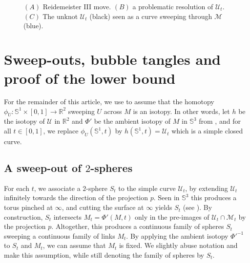 \documentclass[10pt,a4paper]{amsart}
\newcommand{\R}{\mathbb{R}}
\newcommand{\Sp}{\mathbb{S}}
\begin{document}
\begin{figure}
\begin{center}
\caption{$(A)$ Reidemeister III move. $(B)$ a problematic resolution of $\mathcal{U}_t$. $(C)$ The unknot $\mathcal{U}_t$ (black) seen as a curve sweeping through $\mathcal{M}$ (blue).}
\label{pic_reidemeister_issues}
\end{center}
\end{figure}

\section{Sweep-outs, bubble tangles and proof of the lower bound}\label{sec_tangle}

For the remainder of this article, we use  to assume that the homotopy $\phi_U : \Sp^1 \times [0,1] \to \R^2$ sweeping $U$ across $M$ is an isotopy.
In other words, let $h$ be the isotopy of $\mathcal{U}$ in $\R^2$ and $\Phi'$ be the ambient isotopy of $M$ in $\Sp^3$ from , and for all $t \in [0,1]$, we replace $\phi_U (\Sp^1, t)$ by $h (\Sp^1, t) = \mathcal{U}_t$ which is a simple closed curve.

\subsection{A sweep-out of $2$-spheres}
\label{sec:sweepout}

For each $t$, we associate a $2$-sphere $S_t$ to the simple curve $\mathcal{U}_t$, by extending $\mathcal{U}_t$ infinitely towards the direction of the projection $p$. Seen in $\Sp^3$ this produces a torus pinched at $\infty$, and cutting the surface at $\infty$ yields $S_t$ (see ). By construction, $S_t$ intersects $M_t = \Phi'(M,t)$ only in the pre-images of $\mathcal{U}_t \cap \mathcal{M}_t$ by the projection $p$. Altogether, this produces a continuous family of spheres $S_t$ sweeping a continuous family of links $M_t$. By applying the ambient isotopy $\Phi'^{-1}$ to $S_t$ and $M_t$, we can assume that $M_t$ is fixed. We slightly abuse notation and make this assumption, while still denoting the family of spheres by $S_t$. 
\end{document}

